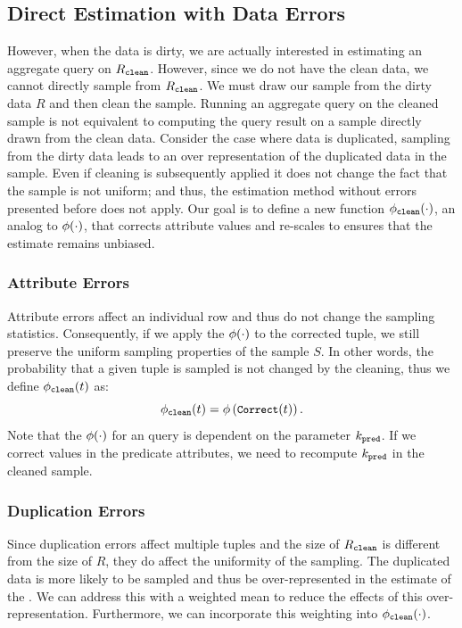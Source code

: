 \subsection{Direct Estimation with Data Errors}
However, when the data is dirty, we are actually interested in estimating an aggregate query on $R_{\texttt{clean} }$.
However, since we do not have the clean data, we cannot directly sample from $R_{\texttt{clean} }$.
We must draw our sample from the dirty data $R$ and then clean the sample.
Running an aggregate query on the cleaned sample is not equivalent to computing the query result on a sample directly drawn from the clean data.
Consider the case where data is duplicated, sampling from the dirty data leads to an over representation of the duplicated data in the sample.
Even if cleaning is subsequently applied it does not change the fact that the sample is not uniform; and thus, the estimation method without errors presented before does not apply.
Our goal is to define a new function $\phi_{\texttt{clean} } (\cdot)$, an analog to $\phi (\cdot)$, that corrects attribute values and re-scales to ensures that the estimate remains unbiased.

\subsubsection{Attribute Errors}
Attribute errors affect an individual row and thus do not change the sampling statistics.
Consequently, if we apply the $\phi (\cdot)$ to the corrected tuple, we still preserve the uniform sampling properties of the sample $S$.
In other words, the probability that a given tuple is sampled is not changed by the cleaning, thus we define $\phi_{\texttt{clean} } (t)$ as:
\[\small
\phi_{\texttt{clean} } (t) = \phi  \left( \texttt{Correct}(t) \right).
\]
Note that the $\phi (\cdot)$ for an \avgfunc query is dependent on the parameter $k_{\texttt{pred} }$. 
If we correct values in the predicate attributes, we need to recompute $k_{\texttt{pred} }$ in the cleaned sample.

\subsubsection{Duplication Errors}
Since duplication errors affect multiple tuples and the size of $R_{\texttt{clean} }$ is different from the size of $R$, they do affect the uniformity of the sampling.
The duplicated data is more likely to be sampled and thus be over-represented in the estimate of the \mean.
We can address this with a weighted mean to reduce the effects of this over-representation.
Furthermore, we can incorporate this weighting into $\phi_{\texttt{clean} } (\cdot)$.

